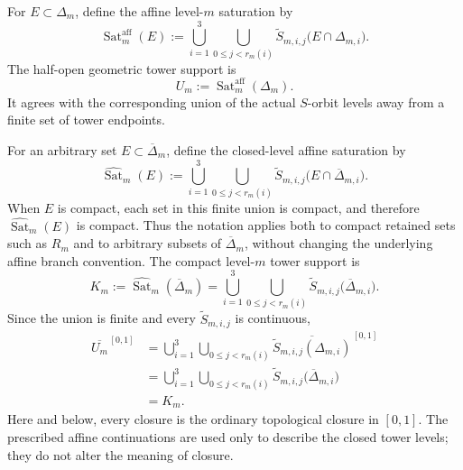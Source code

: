 \documentclass[11pt]{amsart}
\theoremstyle{plain}
\theoremstyle{definition}
\theoremstyle{remark}
\begin{document}
For \(E\subset\Delta_m\), define the affine level-\(m\) saturation by
\[
        \operatorname{Sat}^{\mathrm{aff}}_m(E)
        :=
        \bigcup_{i=1}^{3}
        \bigcup_{0\leq j<r_m(i)}
        \widetilde S_{m,i,j}
        \bigl(E\cap\Delta_{m,i}\bigr).
\tag{8.15}
\label{eq:BT-affine-saturation}
\]
The half-open geometric tower support is
\[
        U_m
        :=
        \operatorname{Sat}^{\mathrm{aff}}_m(\Delta_m).
\tag{8.16}
\label{eq:BT-tower-support}
\]
It agrees with the corresponding union of the actual \(S\)-orbit
levels away from a finite set of tower endpoints.

For an arbitrary set \(E\subset\overline{\Delta}_m\), define the
closed-level affine saturation by
\[
        \widehat{\operatorname{Sat}}_m(E)
        :=
        \bigcup_{i=1}^{3}
        \bigcup_{0\leq j<r_m(i)}
        \widetilde S_{m,i,j}
        \bigl(E\cap\overline{\Delta}_{m,i}\bigr).
\tag{8.17}
\label{eq:BT-compact-saturation}
\]
When \(E\) is compact, each set in this finite union is compact, and
therefore \(\widehat{\operatorname{Sat}}_m(E)\) is compact. Thus the
notation applies both to compact retained sets such as \(R_m\) and to
arbitrary subsets of \(\overline{\Delta}_m\), without changing the
underlying affine branch convention.
The compact level-\(m\) tower support is
\[
        K_m
        :=
        \widehat{\operatorname{Sat}}_m(\overline{\Delta}_m)
        =
        \bigcup_{i=1}^{3}
        \bigcup_{0\leq j<r_m(i)}
        \widetilde S_{m,i,j}
        \bigl(\overline{\Delta}_{m,i}\bigr).
\tag{8.18}
\label{eq:BT-compact-tower-support}
\]
Since the union is finite and every
\(\widetilde S_{m,i,j}\) is continuous,
\[
\begin{aligned}
        \overline{U_m}^{\,[0,1]}
        &=
        \bigcup_{i=1}^{3}
        \bigcup_{0\leq j<r_m(i)}
        \overline{
        \widetilde S_{m,i,j}(\Delta_{m,i})
        }^{\,[0,1]}\\
        &=
        \bigcup_{i=1}^{3}
        \bigcup_{0\leq j<r_m(i)}
        \widetilde S_{m,i,j}
        \bigl(\overline{\Delta}_{m,i}\bigr)\\
        &=
        K_m.
\end{aligned}
\tag{8.19}
\label{eq:BT-Km-closure-Um}
\]
Here and below, every closure is the ordinary topological closure in
\([0,1]\). The prescribed affine continuations are used only to describe
the closed tower levels; they do not alter the meaning of closure.
\end{document}
